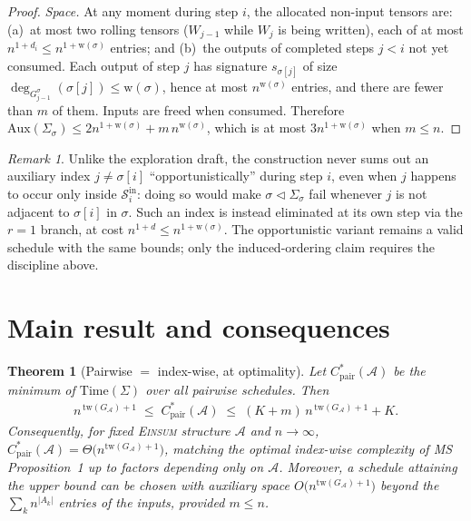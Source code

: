 \documentclass[11pt]{article}
\newcommand{\Einsum}{\textsc{Einsum}}
\newcommand{\calA}{\mathcal{A}}
\newcommand{\calS}{\mathcal{S}}
\newcommand{\tw}{\mathrm{tw}}
\newcommand{\treewidthp}[1]{\tw(#1)}
\newcommand{\degp}[2]{\deg_{#2}(#1)}
\newcommand{\graphform}[1]{G_{#1}}
\newcommand{\wid}{\mathrm{w}}
\newcommand{\Time}{\mathrm{Time}}
\newcommand{\Aux}{\mathrm{Aux}}
\theoremstyle{plain}
\newtheorem{theorem}{Theorem}
\theoremstyle{definition}
\theoremstyle{remark}
\newtheorem{remark}{Remark}
\begin{document}
\begin{proof}
\emph{Space.}  At any moment during step $i$, the allocated non-input
tensors are: (a)~at most two rolling tensors ($W_{j-1}$ while $W_j$ is
being written), each of at most $n^{1+d_i} \le n^{1+\wid(\sigma)}$
entries; and (b)~the outputs of completed steps $j<i$ not yet consumed.
Each output of step $j$ has signature $s_{\sigma[j]}$ of size
$\degp{\sigma[j]}{G^\sigma_{j-1}} \le \wid(\sigma)$, hence at most
$n^{\wid(\sigma)}$ entries, and there are fewer than $m$ of them.  Inputs
are freed when consumed.  Therefore
$\Aux(\Sigma_\sigma) \le 2 n^{1+\wid(\sigma)} + m\, n^{\wid(\sigma)}$,
which is at most $3 n^{1+\wid(\sigma)}$ when $m\le n$.
\end{proof}

\begin{remark}
\label{rem:early-contraction}
Unlike the exploration draft, the construction never sums out an
auxiliary index $j\neq\sigma[i]$ ``opportunistically'' during step $i$,
even when $j$ happens to occur only inside $\calS_i^{\mathrm{in}}$:
doing so would make $\sigma \vartriangleleft \Sigma_\sigma$ fail whenever
$j$ is not adjacent to $\sigma[i]$ in $\sigma$.  Such an index is instead
eliminated at its own step via the $r=1$ branch, at cost
$n^{1+d} \le n^{1+\wid(\sigma)}$.  The opportunistic variant remains a
valid schedule with the same bounds; only the induced-ordering claim
requires the discipline above.
\end{remark}

\section{Main result and consequences}
\label{sec:main}

\begin{theorem}[Pairwise $=$ index-wise, at optimality]
\label{thm:main}
Let $C^\ast_{\mathrm{pair}}(\calA)$ be the minimum of $\Time(\Sigma)$
over all pairwise schedules.  Then
\begin{align*}
   n^{\,\treewidthp{\graphform{\calA}}+1}
   \;\le\;
   C^\ast_{\mathrm{pair}}(\calA)
   \;\le\;
   (K+m)\, n^{\,\treewidthp{\graphform{\calA}}+1} + K .
\end{align*}
Consequently, for fixed \Einsum{} structure $\calA$ and $n\to\infty$,
$C^\ast_{\mathrm{pair}}(\calA) = \Theta\bigl(n^{\treewidthp{\graphform{\calA}}+1}\bigr)$,
matching the optimal index-wise complexity of MS Proposition~1 up to
factors depending only on $\calA$.  Moreover, a schedule attaining the
upper bound can be chosen with auxiliary space
$O\bigl(n^{\treewidthp{\graphform{\calA}}+1}\bigr)$ beyond the
$\sum_{k} n^{|A_k|}$ entries of the inputs, provided $m\le n$.
\end{theorem}
\end{document}
